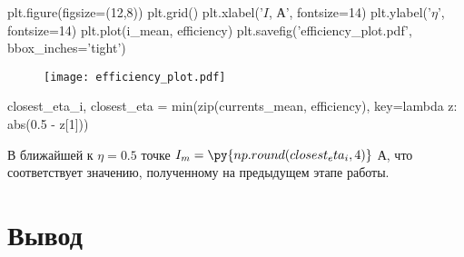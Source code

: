\documentclass[12pt, a4paper]{article}
\begin{document}
\begin{pycode}
plt.figure(figsize=(12,8))
plt.grid()
plt.xlabel('$I$, А', fontsize=14)
plt.ylabel('$\eta$', fontsize=14)
plt.plot(i_mean, efficiency)
plt.savefig('efficiency_plot.pdf', bbox_inches='tight')
\end{pycode}

\begin{figure}[H]
\texttt{[image: efficiency\_plot.pdf]}
\end{figure}

\begin{pycode}
closest_eta_i, closest_eta = min(zip(currents_mean, efficiency),
key=lambda z: abs(0.5 - z[1]))
\end{pycode}

В ближайшей к $\eta = 0.5$ точке $I_m = \py{np.round(closest_eta_i, 4)}$ А,
что соответствует значению, полученному на предыдущем этапе работы.


\section*{Вывод}
\end{document}
